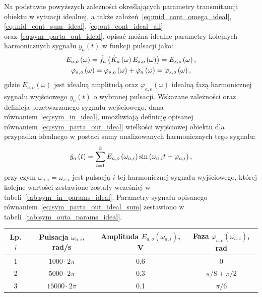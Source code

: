 Na podstawie powyższych zależności określających parametry transmitancji obiektu w sytuacji idealnej, a także założeń~\eqref{eq:mid_cont_omega_ideal}, \eqref{eq:mid_cont_sum_ideal}, \eqref{eq:out_cont_ideal_all} oraz~\eqref{eq:sym_parta_out_ideal}, opisać można idealne parametry kolejnych harmonicznych sygnału $y_{a}(t)$ w funkcji pulsacji jako:
\begin{gather}
E_{a,o} \left(\omega\right) = \dot{f}_{a} \left(\dot{K}_{a} \left(\omega\right) E_{s,o} \left(\omega\right)\right) = E_{s,o} \left(\omega\right) \label{eq:sym_parta_amp_out_ideal}, \\
\varphi_{a,o} \left(\omega\right) = \varphi_{s,o} \left(\omega\right) + \dot{\varphi}_{a} \left(\omega\right) = \varphi_{s,o} \left(\omega\right) \label{eq:sym_parta_phi_out_ideal},
\end{gather}
gdzie $E_{a,o}(\omega)$ jest idealną amplitudą oraz $\varphi_{a,o}(\omega)$ idealną fazą harmonicznej sygnału wyjściowego $y_{a}(t)$ o wybranej pulsacji. Wskazane zależności oraz definicja przetwarzanego sygnału wejściowego, dana równaniem~\eqref{eq:sym_in_ideal}, umożliwiają definicję opisanej równaniem~\eqref{eq:sym_parta_out_ideal} wielkości wyjściowej obiektu dla przypadku idealnego w postaci sumy analizowanych harmonicznych tego sygnału:
\begin{equation}
\dot{y}_{a} \left(t\right) = \sum _{i=1} ^{3} E_{a,o} \left(\omega_{a,i}\right) \sin \left(\omega_{a,i} t + \varphi_{a,i}\right) \label{eq:sym_parta_out_ideal_sum},
\end{equation}
przy czym $\omega_{a,i} = \omega_{s,i}$ jest pulsacją $i$-tej harmonicznej sygnału wyjściowego, której kolejne wartości zestawione zostały wcześniej w tabeli~\ref{tab:sym_in_params_ideal}. Parametry sygnału opisanego równaniem~\eqref{eq:sym_parta_out_ideal_sum} zestawiono w tabeli~\ref{tab:sym_outa_params_ideal}.

\begin{table}[htb!]
\begin{center}
\begin{tabular}[c]{| c | c | c | c |} \hline
\textbf{Lp. $i$} & \textbf{Pulsacja $\omega_{a,i}$, rad/s} & \textbf{Amplituda $E_{a,o}(\omega_{a,i})$, V} & \textbf{Faza $\varphi_{a,o}(\omega_{a,i})$, rad} \\ \hline
1 & $1000  \cdot 2\pi$ &  0.6 & $0$                 \\ \hline
2 & $5000  \cdot 2\pi$ &  0.3 & $\pi / 8 + \pi / 2$ \\ \hline
3 & $15000 \cdot 2\pi$ &  0.1 & $\pi / 6$           \\ \hline
\end{tabular}
\end{center}
\end{table}

